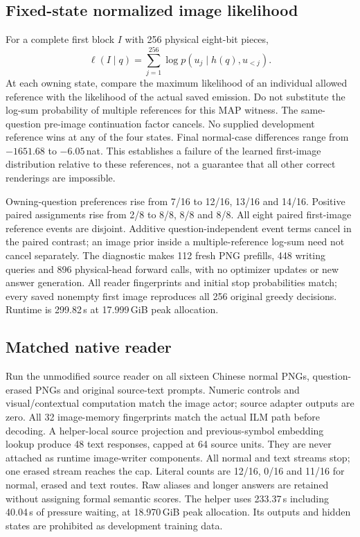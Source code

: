 \subsection*{Fixed-state normalized image likelihood}
For a complete first block $I$ with 256 physical eight-bit pieces,
\[
\ell(I\mid q)=\sum_{j=1}^{256}\log p(u_j\mid h(q),u_{<j}).
\]
At each owning state, compare the maximum likelihood of an individual allowed
reference with the likelihood of the actual saved emission. Do not substitute
the log-sum probability of multiple references for this MAP witness. The
same-question pre-image continuation factor cancels. No supplied development
reference wins at any of the four states. Final normal-case differences
range from $-1651.68$ to $-6.05$\,nat. This establishes a failure of the learned
first-image distribution relative to these references, not a guarantee that
all other correct renderings are impossible.

Owning-question preferences rise from 7/16 to 12/16, 13/16 and 14/16.
Positive paired assignments rise from 2/8 to 8/8, 8/8 and 8/8. All eight
paired first-image reference events are disjoint. Additive question-independent
event terms cancel in the paired contrast; an image prior inside a
multiple-reference log-sum need not cancel separately. The diagnostic makes
112 fresh PNG prefills, 448 writing queries and 896 physical-head forward
calls, with no optimizer updates or new answer generation. All reader
fingerprints and initial stop probabilities match; every saved nonempty
first image reproduces all 256 original greedy decisions. Runtime is
299.82\,s at 17.999\,GiB peak allocation.

\subsection*{Matched native reader}
Run the unmodified source reader on all sixteen Chinese normal PNGs,
question-erased PNGs and original source-text prompts. Numeric controls and
visual/contextual computation match the image actor; source adapter outputs
are zero. All 32 image-memory fingerprints match the actual ILM path before
decoding. A helper-local source projection and previous-symbol embedding
lookup produce 48 text responses, capped at 64 source units. They are never
attached as runtime image-writer components. All normal and text streams
stop; one erased stream reaches the cap. Literal counts are 12/16, 0/16 and
11/16 for normal, erased and text routes. Raw aliases and longer answers
are retained without assigning formal semantic scores. The helper uses
233.37\,s including 40.04\,s of pressure waiting, at 18.970\,GiB peak allocation.
Its outputs and hidden states are prohibited as development training data.

